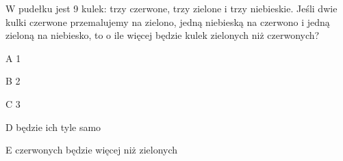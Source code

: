 \begin{tresc}
W pudełku jest 9 kulek: trzy czerwone, trzy zielone i trzy niebieskie. Jeśli dwie kulki czerwone przemalujemy na zielono, jedną niebieską na czerwono i jedną zieloną na niebiesko, to o ile więcej będzie kulek zielonych niż czerwonych?
\end{tresc}
\begin{wariant}{A} 1 \end{wariant}
\begin{wariant}{B} 2 \end{wariant}
\begin{wariant}{C} 3 \end{wariant}
\begin{wariant}{D} będzie ich tyle samo \end{wariant}
\begin{wariant}{E} czerwonych będzie więcej niż zielonych \end{wariant}
